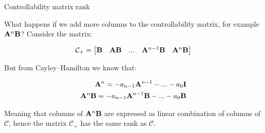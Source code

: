 \documentclass{beamer}
\begin{document}
\begin{frame}{Controllability matrix rank}
	\begin{flushleft}
		
		What happens if we add more columns to the controllability matrix, for example $\mathbf{A}^n \mathbf{B}$? Consider the matrix:
		
		\begin{equation}
			\mathcal{C}_+ = \begin{bmatrix}
				\mathbf{B} &
				\mathbf{A} \mathbf{B} & ... &
				\mathbf{A}^{n - 1} \mathbf{B} &
				\mathbf{A}^n \mathbf{B}
			\end{bmatrix}
		\end{equation}
		
		But from Cayley–Hamilton we know that: 
		
		\begin{align}
			\mathbf{A}^n = -a_{n-1}\mathbf{A}^{n-1} - ... - a_0\mathbf{I} 
			\\
			\mathbf{A}^n\mathbf{B} = -a_{n-1}\mathbf{A}^{n-1}\mathbf{B} - ... - a_0\mathbf{B}
		\end{align}
		
		Meaning that columns of $\mathbf{A}^n\mathbf{B}$ are expressed as linear combination of columns of $\mathcal{C}$, hence the matrix $\mathcal{C}_+$ has the same rank as $\mathcal{C}$.
		
	\end{flushleft}
\end{frame}


%		
%		
%		
%		
%		
\end{document}

